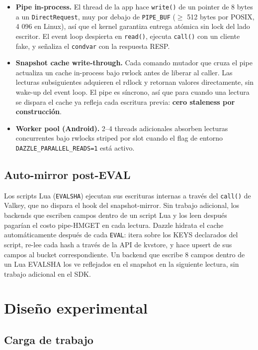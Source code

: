 \begin{itemize}
\tightlist
\item
  \textbf{Pipe in-process.} El thread de la app hace \texttt{write()} de un
  pointer de 8 bytes a un \texttt{DirectRequest}, muy por debajo de
  \texttt{PIPE\_BUF} (\(\geq\) 512 bytes por POSIX, 4 096 en Linux), así que el
  kernel garantiza entrega atómica sin lock del lado escritor. El event loop
  despierta en \texttt{read()}, ejecuta \texttt{call()} con un cliente fake, y
  señaliza el \texttt{condvar} con la respuesta RESP.
\item
  \textbf{Snapshot cache write-through.} Cada comando mutador que cruza el pipe
  actualiza un cache in-process bajo rwlock antes de liberar al caller. Las
  lecturas subsiguientes adquieren el rdlock y retornan valores directamente,
  sin wake-up del event loop. El pipe es síncrono, así que para cuando una
  lectura se dispara el cache ya refleja cada escritura previa: \textbf{cero
  staleness por construcción}.
\item
  \textbf{Worker pool (Android).} 2--4 threads adicionales absorben lecturas
  concurrentes bajo rwlocks striped por slot cuando el flag de entorno
  \texttt{DAZZLE\_PARALLEL\_READS=1} está activo.
\end{itemize}

\subsection{Auto-mirror post-EVAL}\label{auto-mirror-post-eval}

Los scripts Lua (\texttt{EVALSHA}) ejecutan sus escrituras internas a través del
\texttt{call()} de Valkey, que no dispara el hook del snapshot-mirror. Sin
trabajo adicional, los backends que escriben campos dentro de un script Lua y
los leen después pagarían el costo pipe-HMGET en cada lectura. Dazzle hidrata el
cache automáticamente después de cada \texttt{EVAL}: itera sobre los KEYS
declarados del script, re-lee cada hash a través de la API de kvstore, y hace
upsert de sus campos al bucket correspondiente. Un backend que escribe 8 campos
dentro de un Lua EVALSHA los ve reflejados en el snapshot en la siguiente
lectura, sin trabajo adicional en el SDK.

\section{Diseño experimental}\label{diseuxf1o-experimental}

\subsection{Carga de trabajo}\label{carga-de-trabajo}

